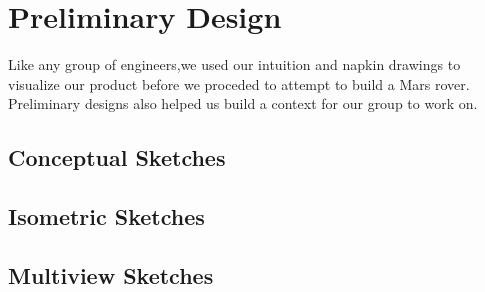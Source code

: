 \chapter{Preliminary Design}
Like any group of engineers,we used our intuition and napkin drawings to visualize our product before we proceded to attempt to build a Mars rover.
Preliminary designs also helped us build a context for our group to work on.

\section{Conceptual Sketches}


\section{Isometric Sketches}


\section{Multiview Sketches}

